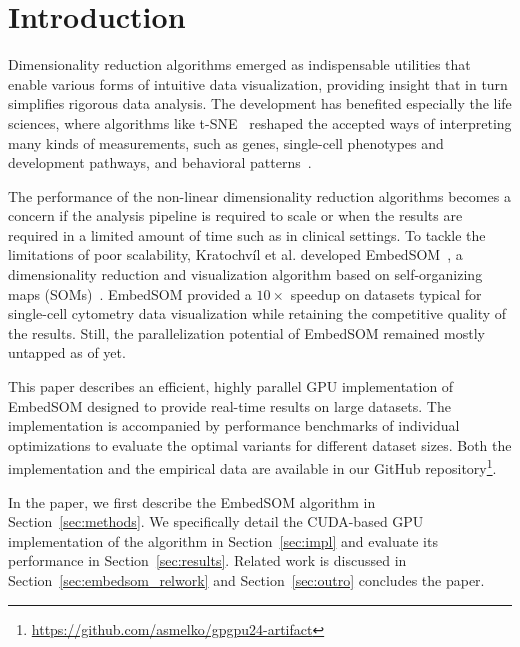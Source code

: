 \section{Introduction\label{sec:intro}}

Dimensionality reduction algorithms emerged as indispensable utilities that enable various forms of intuitive data visualization, providing insight that in turn simplifies rigorous data analysis.
The development has benefited especially the life sciences, where algorithms like t-SNE~\cite{maaten2008visualizing} reshaped the accepted ways of interpreting many kinds of measurements, such as genes, single-cell phenotypes and development pathways, and behavioral patterns~\cite{toghi2019quantitative,cande2018optogenetic}.

The performance of the non-linear dimensionality reduction algorithms becomes a concern if the analysis pipeline is required to scale or when the results are required in a limited amount of time such as in clinical settings.
To tackle the limitations of poor scalability, Kratochvíl et al. developed EmbedSOM~\cite{kratochvil2019generalized}, a dimensionality reduction and visualization algorithm based on self-organizing maps (SOMs)~\cite{kohonen1990self}.
EmbedSOM provided a $10\times$ speedup on datasets typical for single-cell cytometry data visualization while retaining the competitive quality of the results.
Still, the parallelization potential of EmbedSOM remained mostly untapped as of yet.

This paper describes an efficient, highly parallel GPU implementation of EmbedSOM designed to provide real-time results on large datasets. The implementation is accompanied by performance benchmarks of individual optimizations to evaluate the optimal variants for different dataset sizes. Both the implementation and the empirical data are available in our GitHub repository\footnote{\url{https://github.com/asmelko/gpgpu24-artifact}}.

In the paper, we first describe the EmbedSOM algorithm in Section~\ref{sec:methods}. We specifically detail the CUDA-based GPU implementation of the algorithm in Section~\ref{sec:impl} and evaluate its performance in Section~\ref{sec:results}. Related work is discussed in Section~\ref{sec:embedsom_relwork} and Section~\ref{sec:outro} concludes the paper.


